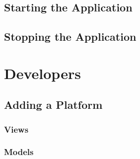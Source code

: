 \documentclass{article}
\begin{document}
      \subsection{Starting the Application}

      \subsection{Stopping the Application}

    \section{Developers}
      \subsection{Adding a Platform}

      \subsubsection{Views}

      \subsubsection{Models}
\end{document}
